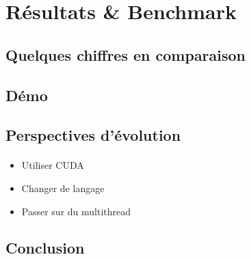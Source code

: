 \section{Résultats \& Benchmark}

\subsection{Quelques chiffres en comparaison}

\begin{frame}[fragile=singleslide]{\insertsectionhead}
  \framesubtitle{\insertsubsectionhead}
\end{frame}

\subsection{Démo}

\begin{frame}[fragile=singleslide]{\insertsectionhead}
  \framesubtitle{\insertsubsectionhead}
\end{frame}

\subsection{Perspectives d'évolution}

\begin{frame}[fragile=singleslide]{\insertsectionhead}
  \framesubtitle{\insertsubsectionhead}
  \begin{itemize}
    \item Utiliser CUDA
  \end{itemize}
  \hfill
  \begin{itemize}
    \item Changer de langage
  \end{itemize}
  \hfill
  \begin{itemize}
    \item Passer sur du multithread
  \end{itemize}
\end{frame}

\subsection{Conclusion}

\begin{frame}[fragile=singleslide]{\insertsectionhead}
  \framesubtitle{\insertsubsectionhead}
\end{frame}

